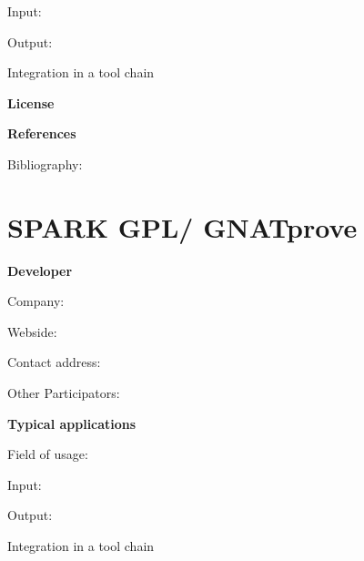 	Input:

	Output:





	Integration in a tool chain



	\textbf{License}


	\textbf{References}

	Bibliography:


\section{SPARK GPL/ GNATprove}

	\textbf{Developer}

	Company: 

	Webside:

	Contact address:

	Other  Participators:



	\textbf{Typical applications}

	Field of usage:


	Input:

	Output:





	Integration in a tool chain



